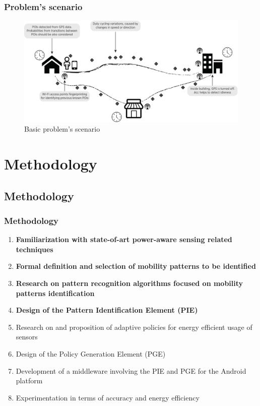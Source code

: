 \documentclass[compress,9pt,xcolor={dvipsnames,table}]{beamer}
\begin{document}
\begin{frame}[t]\frametitle{Problem's scenario}
\begin{figure}[tb]
  \centering
  \includegraphics[width=\textwidth]{../../../resources/images/vectors/scenario}
  \caption{Basic problem's scenario}
  \label{fig:scenario}
\end{figure}
\end{frame}


\section{Methodology}
\subsection{Methodology}
\begin{frame}\frametitle{Methodology}
\begin{enumerate}
  \item \textbf{Familiarization with state-of-art power-aware sensing related techniques}
  \item \textbf{Formal definition and selection of mobility patterns to be identified}
  \item \textbf{Research on pattern recognition algorithms focused on mobility patterns identification}
  \item \textbf{Design of the Pattern Identification Element (PIE)}
  \item Research on and proposition of adaptive policies for energy efficient usage of sensors
  \item Design of the Policy Generation Element (PGE)
  \item Development of a middleware involving the PIE and PGE for the Android platform
  \item Experimentation in terms of accuracy and energy efficiency
\end{enumerate}
\end{frame}
\end{document}
